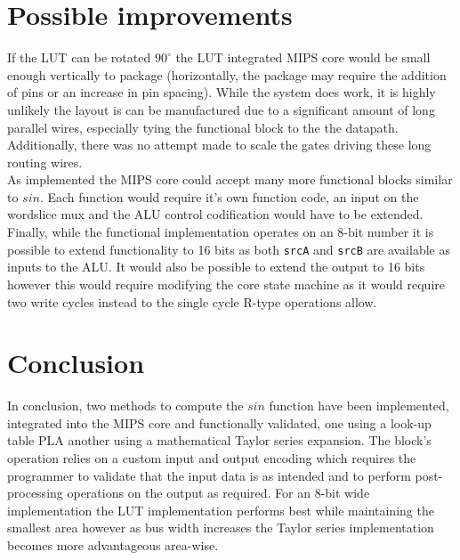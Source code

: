 \documentclass[10pt,journal]{IEEEtran}
\begin{document}
\section{Possible improvements}
If the LUT can be rotated $90^{\circ}$ the LUT integrated MIPS core would be small enough vertically to package (horizontally, the package may require the addition of pins or an increase in pin spacing).
While the system does work, it is highly unlikely the layout is can be manufactured due to a significant amount of long parallel wires, especially tying the functional block to the the datapath. Additionally, there was no attempt made to scale the gates driving these long routing wires.\\
As implemented the MIPS core could accept many more functional blocks similar to $sin$. Each function would require it's own function code, an input on the wordslice mux and the ALU control codification would have to be extended.\\
Finally, while the functional implementation operates on an 8-bit number it is possible to extend functionality to 16 bits as both \texttt{srcA} and \texttt{srcB} are available as inputs to the ALU. It would also be possible to extend the output to 16 bits however this would require modifying the core state machine as it would require two write cycles instead to the single cycle R-type operations allow.

\section{Conclusion}
In conclusion, two methods to compute the $sin$ function have been implemented, integrated into the MIPS core and functionally validated, one using a look-up table PLA another using a mathematical Taylor series expansion. The block's operation relies on a custom input and output encoding which requires the programmer to validate that the input data is as intended and to perform post-processing operations on the output as required. For an 8-bit wide implementation the LUT implementation performs best while maintaining the smallest area however as bus width increases the Taylor series implementation becomes more advantageous area-wise.
\end{document}
